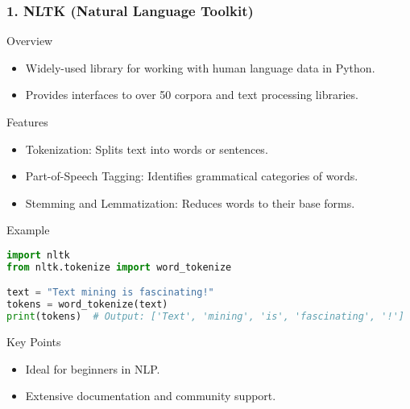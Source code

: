 \documentclass[aspectratio=169]{beamer}
\begin{document}
\begin{frame}[fragile]
    \frametitle{1. NLTK (Natural Language Toolkit)}
    \begin{block}{Overview}
        \begin{itemize}
            \item Widely-used library for working with human language data in Python.
            \item Provides interfaces to over 50 corpora and text processing libraries.
        \end{itemize}
    \end{block}
    
    \begin{block}{Features}
        \begin{itemize}
            \item Tokenization: Splits text into words or sentences.
            \item Part-of-Speech Tagging: Identifies grammatical categories of words.
            \item Stemming and Lemmatization: Reduces words to their base forms.
        \end{itemize}
    \end{block}
    
    \begin{block}{Example}
        \begin{lstlisting}[language=Python]
import nltk
from nltk.tokenize import word_tokenize

text = "Text mining is fascinating!"
tokens = word_tokenize(text)
print(tokens)  # Output: ['Text', 'mining', 'is', 'fascinating', '!']
        \end{lstlisting}
    \end{block}
    
    \begin{block}{Key Points}
        \begin{itemize}
            \item Ideal for beginners in NLP.
            \item Extensive documentation and community support.
        \end{itemize}
    \end{block}
\end{frame}
\end{document}
